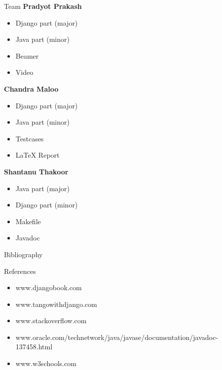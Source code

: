 \documentclass{beamer}
\begin{document}
\begin{frame}[t]{Team}
\textbf{Pradyot Prakash}\\
\pause
\begin{itemize}[<+->]
\item Django part (major)
\item Java part (minor)
\item Beamer
\item Video
\end{itemize}
  \pause
\textbf{Chandra Maloo}\\
\pause
\begin{itemize}[<+->]
\item Django part (major)
\item Java part (minor)
\item Testcases
\item LaTeX Report
\end{itemize}
\pause
\textbf{Shantanu Thakoor}\\
\pause
\begin{itemize}[<+->]
\item Java part (major)
\item Django part (minor)
\item Makefile
\item Javadoc
\end{itemize}
\pause
\end{frame}

\begin{frame}[t]{Bibliography}{}
     \vspace{10mm}
 \begin{beamerboxesrounded}[lower=blockstext,upper=blockstitle]{References}
    \pause
    \begin{itemize}[<+->]
    \item www.djangobook.com
    \item www.tangowithdjango.com
    \item www.stackoverflow.com
    \item www.oracle.com/technetwork/java/javase/documentation/javadoc-137458.html
    \item www.w3schools.com
 \end{itemize}
      \pause
      {}

  \end{beamerboxesrounded}
\end{frame}
\end{document}
